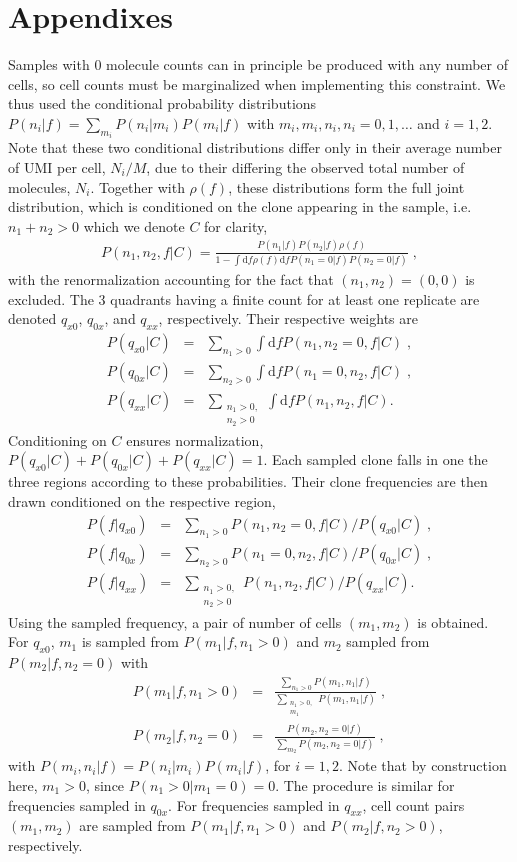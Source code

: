 \documentclass[letterpaper,english,prl,reprint,longbibliography]{revtex4-1} %
\begin{document}
\section{Appendixes}
Samples with 0 molecule counts can in principle be produced with any number of cells, so cell counts must be marginalized when implementing this constraint. We thus used the conditional probability distributions $P(n_i|f)=\sum_{m_i}P(n_i|m_i)P(m_i|f)$ with $m_i,m_i,n_i,n_i=0,1,\dots$ and $i=1,2$. Note that these two conditional distributions differ only in their average number of UMI per cell, $N_i/M$, due to their differing the observed total number of molecules, $N_i$. Together with $\rho(f)$, these distributions form the full joint distribution, which is conditioned on the clone appearing in the sample, i.e. $n_1+n_2>0$ which we denote $C$ for clarity, 
\begin{align}
	P(n_1,n_2,f|C)= \frac{P(n_1|f)P(n_2|f)\rho(f)}{1-\int{\textrm{d}f \rho(f)\textrm{d}f P(n_1=0|f)P(n_2=0|f)}}\;,  
\end{align}
with the renormalization accounting for the fact that $(n_1,n_2)=(0,0)$ is excluded. The 3 quadrants having a finite count for at least one replicate are denoted $q_{x0}$, $q_{0x}$, and $q_{xx}$, respectively. Their respective weights are
\begin{align}
	P(q_{x0}|C)&=&\sum_{n_1>0}\int{\textrm{d}f P(n_1,n_2=0,f|C)}\;,\\
	P(q_{0x}|C)&=&\sum_{n_2>0}\int{\textrm{d}f P(n_1=0,n_2,f|C)}\;,\\
	P(q_{xx}|C)&=&\sum_{\substack{n_1>0,\\n_2>0}}\int{\textrm{d}f P(n_1,n_2,f|C)}.
\end{align}
Conditioning on $C$ ensures normalization, $P(q_{x0}|C)+P(q_{0x}|C)+P(q_{xx}|C)=1$. Each sampled clone falls in one the three regions according to these probabilities. Their clone frequencies are then drawn conditioned on the respective region, 
\begin{align}
	P(f|q_{x0})&=&\sum_{n_1>0}P(n_1,n_2=0,f|C)/P(q_{x0}|C)\;,\\
	P(f|q_{0x})&=&\sum_{n_2>0}P(n_1=0,n_2,f|C)/P(q_{0x}|C)\;,\\
	P(f|q_{xx})&=&\sum_{\substack{n_1>0,\\n_2>0}}P(n_1,n_2,f|C)/P(q_{xx}|C).
\end{align}
Using the sampled frequency, a pair of number of cells $(m_1,m_2)$ is obtained. For $q_{x0}$, $m_1$ is sampled from $P(m_1|f,n_1>0)$ and $m_2$ sampled from $P(m_2|f,n_2=0)$ with 
\begin{align}
	P(m_1|f,n_1>0)&=&\frac{\sum_{n_1>0}P(m_1,n_1|f)}{\sum_{\substack{n_1>0,\\m_1}}P(m_1,n_1|f)}\;,\\
	P(m_2|f,n_2=0)&=&\frac{P(m_2,n_2=0|f)}{\sum_{m_2}P(m_2,n_2=0|f)}\;,
\end{align}
with $P(m_i,n_i|f)=P(n_i|m_i)P(m_i|f)$, for $i=1,2$. Note that by construction here, $m_1>0$, since $P(n_1>0|m_1=0)=0$.
The procedure is similar for frequencies sampled in $q_{0x}$. For frequencies sampled in $q_{xx}$, cell count pairs $(m_1,m_2)$ are sampled from $P(m_1|f,n_1>0)$ and $P(m_2|f,n_2>0)$, respectively. 
\end{document}
